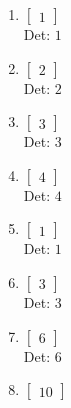 \documentclass[12pt]{article}
\begin{document}
\begin{enumerate}
\begin{enumerate}
\begin{enumerate}
\item $\displaystyle \left[\begin{matrix}1\end{matrix}\right]$\\

Det: $1$\\


\item $\displaystyle \left[\begin{matrix}2\end{matrix}\right]$\\

Det: $2$\\


\item $\displaystyle \left[\begin{matrix}3\end{matrix}\right]$\\

Det: $3$\\


\item $\displaystyle \left[\begin{matrix}4\end{matrix}\right]$\\

Det: $4$\\


\item $\displaystyle \left[\begin{matrix}1\end{matrix}\right]$\\

Det: $1$\\


\item $\displaystyle \left[\begin{matrix}3\end{matrix}\right]$\\

Det: $3$\\


\item $\displaystyle \left[\begin{matrix}6\end{matrix}\right]$\\

Det: $6$\\


\item $\displaystyle \left[\begin{matrix}10\end{matrix}\right]$\\


\end{enumerate}
\end{enumerate}
\end{enumerate}
\end{document}
